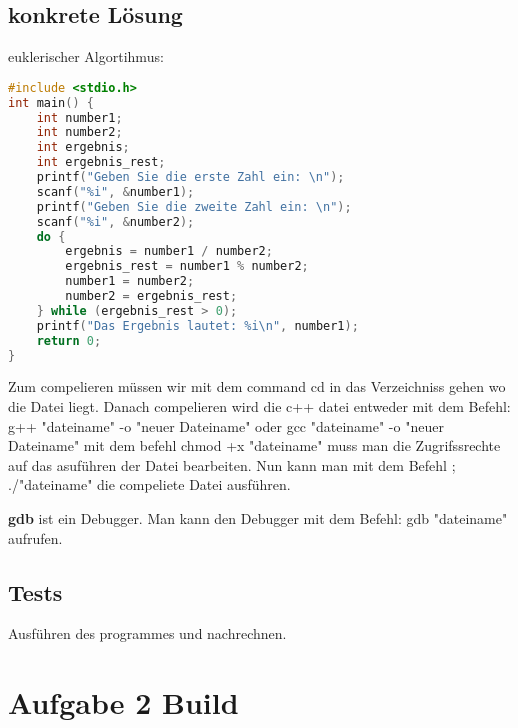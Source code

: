 \documentclass[a4paper,11pt,titlepage]{article}
\begin{document}
\subsection{konkrete L\"osung}
euklerischer Algortihmus: \newline
\begin{lstlisting}[language=c++]
#include <stdio.h>
int main() {
    int number1;
    int number2;
    int ergebnis;
    int ergebnis_rest;
    printf("Geben Sie die erste Zahl ein: \n");
    scanf("%i", &number1); 
    printf("Geben Sie die zweite Zahl ein: \n"); 
    scanf("%i", &number2);
    do { 
        ergebnis = number1 / number2;
        ergebnis_rest = number1 % number2;
        number1 = number2;
        number2 = ergebnis_rest;
    } while (ergebnis_rest > 0);
    printf("Das Ergebnis lautet: %i\n", number1);
    return 0;
} 
\end{lstlisting}
\pagebreak
Zum compelieren müssen wir mit dem command cd in das Verzeichniss gehen wo die Datei liegt. Danach compelieren wird die c++ datei entweder mit dem Befehl: \newline
g++ "dateiname" -o "neuer Dateiname" \newline
oder \newline
gcc "dateiname" -o "neuer Dateiname" \newline
mit dem befehl chmod +x "dateiname" \newline
muss man die Zugrifssrechte auf das asuführen der Datei bearbeiten. \newline
Nun kann man mit dem Befehl ; \newline
./"dateiname"\newline
die compeliete Datei ausführen. \newline

\textbf{gdb} ist ein Debugger. Man kann den Debugger mit dem Befehl: \newline
gdb "dateiname" aufrufen. \newline
\subsection{Tests}
Ausführen des programmes und nachrechnen. \newline

\section{Aufgabe 2 Build}
\end{document}
